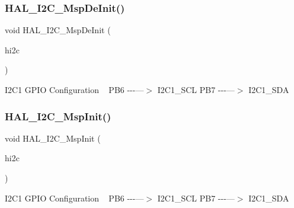 \subsubsection{\texorpdfstring{H\+A\+L\+\_\+\+I2\+C\+\_\+\+Msp\+De\+Init()}{HAL\_I2C\_MspDeInit()}}
{\footnotesize\ttfamily void H\+A\+L\+\_\+\+I2\+C\+\_\+\+Msp\+De\+Init (\begin{DoxyParamCaption}\item[{\mbox{\hyperlink{struct_i2_c___handle_type_def}{I2\+C\+\_\+\+Handle\+Type\+Def}} $\ast$}]{hi2c }\end{DoxyParamCaption})}

I2\+C1 G\+P\+IO Configuration ~\newline
P\+B6 -\/-\/-\/---$>$ I2\+C1\+\_\+\+S\+CL P\+B7 -\/-\/-\/---$>$ I2\+C1\+\_\+\+S\+DA\mbox{\label{group___i2_c___exported___functions___group1_gabe01a202c27b23fc150aa66af3130073}} 
\subsubsection{\texorpdfstring{H\+A\+L\+\_\+\+I2\+C\+\_\+\+Msp\+Init()}{HAL\_I2C\_MspInit()}}
{\footnotesize\ttfamily void H\+A\+L\+\_\+\+I2\+C\+\_\+\+Msp\+Init (\begin{DoxyParamCaption}\item[{\mbox{\hyperlink{struct_i2_c___handle_type_def}{I2\+C\+\_\+\+Handle\+Type\+Def}} $\ast$}]{hi2c }\end{DoxyParamCaption})}

I2\+C1 G\+P\+IO Configuration ~\newline
P\+B6 -\/-\/-\/---$>$ I2\+C1\+\_\+\+S\+CL P\+B7 -\/-\/-\/---$>$ I2\+C1\+\_\+\+S\+DA